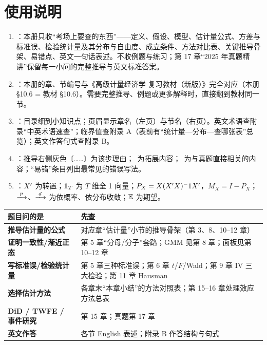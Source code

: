 \chapter*{使用说明}
\begin{enumerate}
\item {}：本册只收“考场上要查的东西”——定义、假设、模型、估计量公式、方差与标准误、检验统计量及其分布与自由度、成立条件、方法对比表、关键推导骨架、易错点、英文一句话表述。不收例题与练习；第 17 章“2025 年真题精讲”保留每一小问的完整推导与英文标准答案。
\item {}：本册的章、节编号与《高级计量经济学 复习教材（新版）》完全对应（本册 §10.6 = 教材 §10.6）。需要完整推导、例题或更多解释时，直接翻到教材同一节。
\item {}：目录细到小知识点；页眉显示章名（左页）与节名（右页）。英文术语查附录“中英术语速查”；临界值查附录 A（表前有“统计量—分布—查哪张表”总览）；英文作答句式查附录 B。
\item {}：推导右侧灰色〔……〕为该步理由；\tagext\ 为拓展内容；\tagexam\ 为与真题直接相关的内容；“易错”条目列出最常见的错误写法。
\item {}：$X'$ 为转置；$\mathbf{1}_T$ 为 $T$ 维全 1 向量；$P_X=X(X' X)^-1 X'$，$M_X=I-P_X$；$\xrightarrow{\;p\;}$、$\xrightarrow{\;d\;}$ 为依概率、依分布收敛；$\mathbb{E}$ 为期望。
\end{enumerate}
\begin{center}
\begin{tabularx}{\linewidth}{>{\bfseries}p{3.3cm}L}
\toprule
题目问的是 & 先查 \\
\midrule
推导估计量的公式 & 对应章“估计量”小节的推导骨架（第 3、8、10–12 章） \\
证明一致性/渐近正态 & 第 5 章“分母/分子”套路；GMM 见第 8 章；面板见第 10–12 章 \\
写标准误/检验统计量 & 第 5 章三种标准误；第 6 章 $t$/$F$/Wald；第 9 章 IV 三大检验；第 11 章 Hausman \\
选择估计方法 & 各章末“本章小结”的方法对照表；第 15–16 章处理效应方法总表 \\
DiD / TWFE / 事件研究 & 第 15 章；真题第 17 章 \\
英文作答 & 各节 English 表述；附录 B 作答结构与句式 \\
\bottomrule
\end{tabularx}
\end{center}
